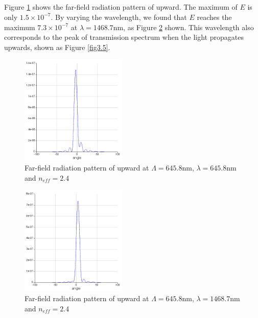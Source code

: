 \documentclass[fontsize=11pt]{scrartcl}
\begin{document}
\subsection{}
Figure \ref{fig3.3} shows the far-field radiation pattern of upward. 
The maximum of $E$ is only $1.5\times 10^{-7}$. 
By varying the wavelength, we found that $E$ reaches the maximum $7.3\times 10^{-7}$ 
at $\lambda=1468.7\mathrm{nm}$, as Figure \ref{fig3.4} shown. This wavelength also corresponds to 
the peak of transmission spectrum when the light propagates upwards, 
shown as Figure \ref{fig3.5}.
\begin{figure}[H]
    \centering
     \includegraphics[width=0.45\textwidth]{img/fig3.3.png}
     \caption{Far-field radiation pattern of upward at $\Lambda=645.8\mathrm{nm}$,
     $\lambda=645.8\mathrm{nm}$ and $n_{eff}=2.4$}
     \label{fig3.3}
\end{figure}
\begin{figure}[H]
    \centering
     \includegraphics[width=0.45\textwidth]{img/fig3.4.png}
     \caption{Far-field radiation pattern of upward at $\Lambda=645.8\mathrm{nm}$,
     $\lambda=1468.7\mathrm{nm}$ and $n_{eff}=2.4$}
     \label{fig3.4}
\end{figure}
\end{document}
